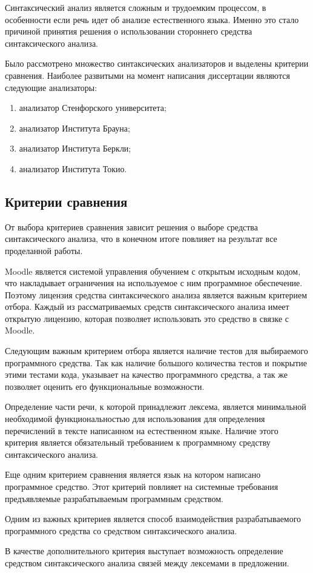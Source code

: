 \documentclass{standalone}
\begin{document}
\par Синтаксический анализ является сложным и трудоемким процессом, в особенности если речь идет об анализе естественного языка. Именно это стало причиной принятия решения о использовании стороннего средства синтаксического анализа.
\par Было рассмотрено множество синтаксических анализаторов и выделены критерии сравнения. Наиболее развитыми на момент написания диссертации являются следующие анализаторы:
\begin{enumerate}
    \item анализатор Стенфорского университета;
    \item анализатор Института Брауна;
    \item анализатор Института Беркли;
    \item анализатор Института Токио.
\end{enumerate}
\subsection{Критерии сравнения}
\par От выбора критериев сравнения зависит решения о выборе средства синтаксического анализа, что в конечном итоге повлияет на результат все проделанной работы.
\par Moodle является системой управления обучением с открытым исходным кодом, что накладывает ограничения на используемое с ним программное обеспечение. Поэтому лицензия средства синтаксического анализа является важным критерием отбора. Каждый из рассматриваемых средств синтаксического анализа имеет открытую лицензию, которая позволяет использовать это средство в связке с Moodle.
\par Следующим важным критерием отбора является наличие тестов для выбираемого программного средства. Так как наличие большого количества тестов и покрытие этими тестами кода, указывает на качество программного средства, а так же позволяет оценить его функциональные возможности.
\par Определение части речи, к которой принадлежит лексема, является минимальной необходимой функциональностью для использования для определения перечислений в тексте написанном на естественном языке. Наличие этого критерия является обязательный требованием к программному средству синтаксического анализа.
\par Еще одним критерием сравнения является язык на котором написано программное средство. Этот критерий повлияет на системные требования предъявляемые разрабатываемым программным средством.
\par Одним из важных критериев является способ взаимодействия разрабатываемого программного средства со средством синтаксического анализа.
\par В качестве дополнительного критерия выступает возможность определение средством синтаксического анализа связей между лексемами в предложении.
\end{document}
